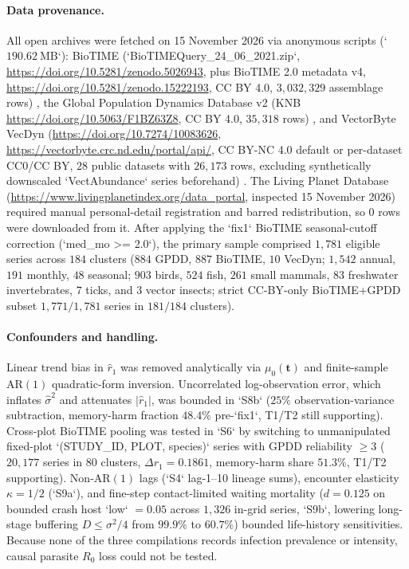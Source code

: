 \paragraph{Data provenance.}
All open archives were fetched on 15 November 2026 via anonymous scripts (`$190.62\ \mathrm{MB}$`): BioTIME (`BioTIMEQuery\_24\_06\_2021.zip`, \url{https://doi.org/10.5281/zenodo.5026943}, plus BioTIME 2.0 metadata v4, \url{https://doi.org/10.5281/zenodo.15222193}, CC BY 4.0, $3{,}032{,}329$ assemblage rows) \citep{biotime2018,dornelas2018,biotime2025,dornelas2025}, the Global Population Dynamics Database v2 (KNB \url{https://doi.org/10.5063/F1BZ63Z8}, CC BY 4.0, $35{,}318$ rows) \citep{prendergast2010}, and VectorByte VecDyn (\url{https://doi.org/10.7274/10083626}, \url{https://vectorbyte.crc.nd.edu/portal/api/}, CC BY-NC 4.0 default or per-dataset CC0/CC BY, $28$ public datasets with $26{,}173$ rows, excluding synthetically downscaled `VectAbundance` series beforehand) \citep{rund2023,neon2023mosquito}. The Living Planet Database (\url{https://www.livingplanetindex.org/data_portal}, inspected 15 November 2026) required manual personal-detail registration and barred redistribution, so $0$ rows were downloaded from it. After applying the `fix1` BioTIME seasonal-cutoff correction (`med\_mo >= 2.0`), the primary sample comprised $1{,}781$ eligible series across $184$ clusters ($884$ GPDD, $887$ BioTIME, $10$ VecDyn; $1{,}542$ annual, $191$ monthly, $48$ seasonal; $903$ birds, $524$ fish, $261$ small mammals, $83$ freshwater invertebrates, $7$ ticks, and $3$ vector insects; strict CC-BY-only BioTIME+GPDD subset $1{,}771/1{,}781$ series in $181/184$ clusters).

\paragraph{Confounders and handling.}
Linear trend bias in $\hat{r}_1$ was removed analytically via $\mu_0(\mathbf{t})$ and finite-sample $\mathrm{AR}(1)$ quadratic-form inversion. Uncorrelated log-observation error, which inflates $\hat{\sigma}^2$ and attenuates $|\hat{r}_1|$, was bounded in `S8b` ($25\%$ observation-variance subtraction, memory-harm fraction $48.4\%$ pre-`fix1`, T1/T2 still supporting). Cross-plot BioTIME pooling was tested in `S6` by switching to unmanipulated fixed-plot `(STUDY\_ID, PLOT, species)` series with GPDD reliability $\ge 3$ ($20{,}177$ series in $80$ clusters, $\Delta r_1 = 0.1861$, memory-harm share $51.3\%$, T1/T2 supporting). Non-$\mathrm{AR}(1)$ lags (`S4` lag-1--10 lineage sums), encounter elasticity $\kappa = 1/2$ (`S9a`), and fine-step contact-limited waiting mortality ($d = 0.125$ on bounded crash host `low` $= 0.05$ across $1{,}326$ in-grid series, `S9b`, lowering long-stage buffering $D \le \sigma^2/4$ from $99.9\%$ to $60.7\%$) bounded life-history sensitivities. Because none of the three compilations records infection prevalence or intensity, causal parasite $R_0$ loss could not be tested.

